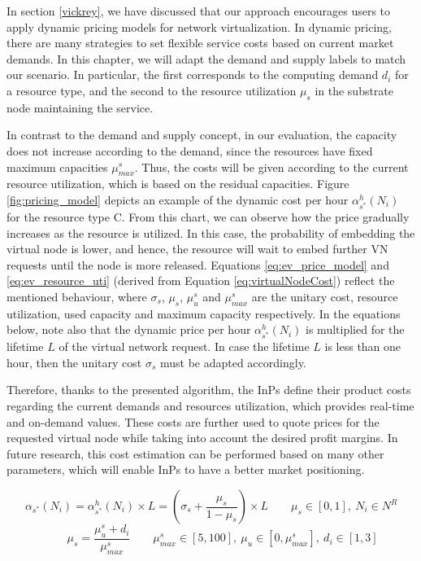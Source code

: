 In section \ref{vickrey}, we have discussed that our approach encourages users to apply dynamic pricing models for network virtualization. In dynamic pricing, there are many strategies to set flexible service costs based on current market demands. In this chapter, we will adapt the demand and supply labels to match our scenario. In particular, the first corresponds to the computing demand $d_i$ for a resource type, and the second to the resource utilization $\mu_s$ in the substrate node maintaining the service.

In contrast to the demand and supply concept, in our evaluation, the capacity does not increase according to the demand, since the resources have fixed maximum capacities $\mu^{s}_{max}$. Thus, the costs will be given according to the current resource utilization, which is based on the residual capacities. Figure \ref{fig:pricing_model} depicts an example of the dynamic cost per hour $\alpha^{h}_{s^{*}}(N_i)$ for the resource type C. From this chart, we can observe how the price gradually increases as the resource is utilized. In this case, the probability of embedding the virtual node is lower, and hence, the resource will wait to embed further VN requests until the node is more released. Equations \ref{eq:ev_price_model} and \ref{eq:ev_resource_uti} (derived from Equation \ref{eq:virtualNodeCost}) reflect the mentioned behaviour, where $\sigma_s$, $\mu_s$, $\mu^{s}_u$ and $\mu^{s}_{max}$ are the unitary cost, resource utilization, used capacity and maximum capacity respectively. In the equations below, note also that the dynamic price per hour $\alpha^{h}_{s^{*}}(N_i)$ is multiplied for the lifetime $L$ of the virtual network request. In case the lifetime $L$ is less than one hour, then the unitary cost $\sigma_s$ must be adapted accordingly.

Therefore, thanks to the presented algorithm, the InPs define their product costs regarding the current demands and resources utilization, which provides real-time and on-demand values. These costs are further used to quote prices for the requested virtual node while taking into account the desired profit margins. In future research, this cost estimation can be performed based on many other parameters, which will enable InPs to have a better market positioning.

  \begin{equation} \label{eq:ev_price_model}
	 \alpha_{s^{*}}(N_i) = \alpha^{h}_{s^{*}}(N_i) \times L =  (\sigma_s + \frac{\mu_s}{1 - \mu_s}) \times L \qquad \mu_s \in [0, 1], \ N_i \in N^R 
  \end{equation}
    \begin{equation} \label{eq:ev_resource_uti}
  \qquad \mu_s = \frac{\mu^{s}_u + d_i}{\mu^{s}_{max}} \qquad \mu^{s}_{max} \in [5,100], \ \mu_u \in [0, \mu^{s}_{max}] , \ d_i \in [1, 3]   
  \end{equation}

